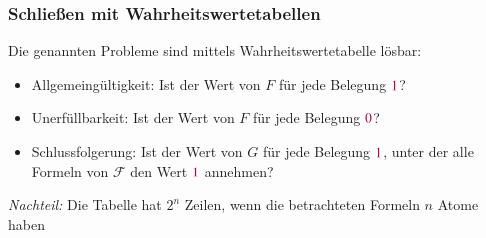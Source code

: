\documentclass[aspectratio=1610,onlymath]{beamer}
\begin{document}
\begin{frame}\frametitle{Schließen mit Wahrheitswertetabellen}

Die genannten Probleme sind mittels Wahrheitswertetabelle lösbar:%
\begin{itemize}
\item \alert{Allgemeingültigkeit:} Ist der Wert von $F$ für jede Belegung $\textcolor{purple}{1}$?
\item \alert{Unerfüllbarkeit:} Ist der Wert von $F$ für jede Belegung $\textcolor{purple}{0}$?
\item \alert{Schlussfolgerung:} Ist der Wert von $G$ für jede Belegung $\textcolor{purple}{1}$, unter der alle Formeln von $\mathcal{F}$ den Wert $\textcolor{purple}{1}$ annehmen?
\end{itemize}\pause

\emph{Nachteil:} Die Tabelle hat $2^n$ Zeilen, wenn die betrachteten Formeln $n$ Atome haben
\bigskip


\end{frame}


\end{document}
